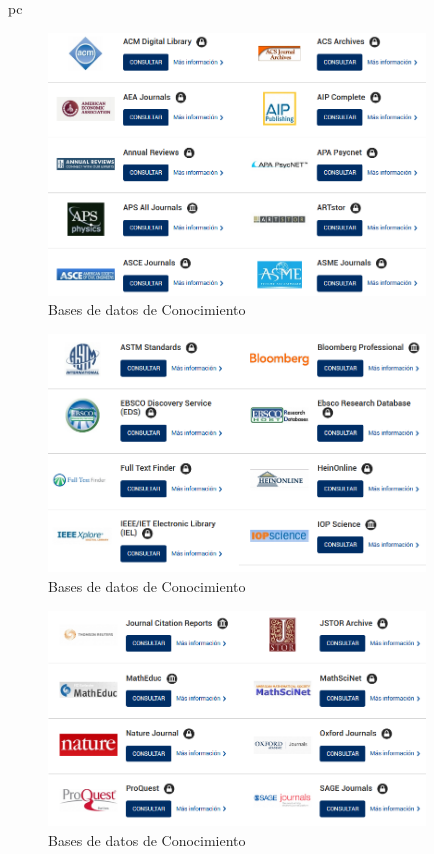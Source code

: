 pc\documentclass[a4paper,12pt,openany]{book}
\begin{document}
\begin{itemize}
        \begin{figure}[H]
        \centering
    	\includegraphics[width=10cm]{basesdedatos1.png}
        \caption{Bases de datos de Conocimiento}
        \label{fig:basededatos1}
        \end{figure}

        \begin{figure}[H]
        \centering
    	\includegraphics[width=10cm]{basesdedatos2.png}
        \caption{Bases de datos de Conocimiento}
        \label{fig:basededatos2}
        \end{figure}

        \begin{figure}[H]
        \centering
    	\includegraphics[width=10cm]{basesdedatos3.png}
        \caption{Bases de datos de Conocimiento}
        \label{fig:basededatos3}
        \end{figure}


\end{itemize}
\end{document}
